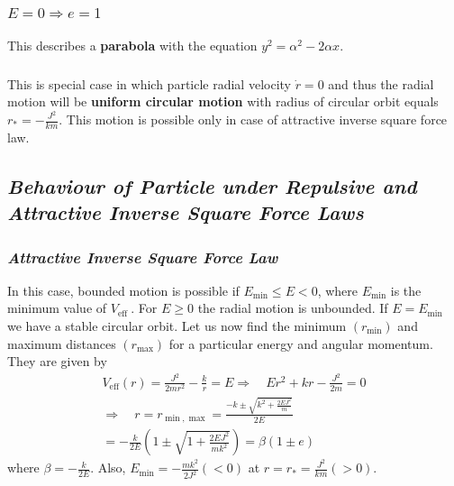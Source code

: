 \documentclass[conference]{IEEEtran}
\begin{document}
\subsubsection{\normalsize{\emph{\textbf{$E=0 \Rightarrow e=1$}}}} This describes a \textbf{parabola} with the equation $y^{2} = \alpha^{2} - 2\alpha x$.
\vspace{1em}



\subsubsection{} This is special case in which particle radial velocity $\dot{r} = 0$ and thus the radial motion will be \textbf{uniform circular motion} with radius of circular orbit equals $r_{*} = -\frac{J^2}{km}$. This motion is possible only in case of attractive inverse square force law.
\vspace{1em}




\subsection{\normalsize{\emph{\textbf{Behaviour of Particle under Repulsive and Attractive Inverse Square Force Laws}}}}

\subsubsection{\normalsize{\emph{\textbf{Attractive Inverse Square Force Law}}}}
In this case, bounded motion is possible if $E_{\min } \leq E<0$, where $E_{\min }$ is the minimum value of $V_{\text {eff }}$. For $E \geq 0$ the radial motion is unbounded. If $E=E_{\min }$ we have a stable circular orbit. Let us now find the minimum $(r_{\min})$ and maximum distances $(r_{\max})$ for a particular energy and
angular momentum. They are given by \begin{dmath}
\begin{array}{c}
V_{\mathrm{eff}}(r)=\frac{J^{2}}{2 m r^{2}}-\frac{k}{r}=E \Rightarrow \quad E r^{2}+k r-\frac{J^{2}}{2 m}=0 \\
\Rightarrow \quad r=r_{\min , \max }=\frac{-k \pm \sqrt{k^{2}+\frac{2 E J^{2}}{m}}}{2 E} \\
=-\frac{k}{2 E}\left(1 \pm \sqrt{1+\frac{2 E J^{2}}{m k^{2}}}\right) =\beta(1 \pm e)
\end{array}
\end{dmath} where $\beta=-\frac{k}{2 E}$. Also, $E_{\min }=-\frac{mk^{2}}{2 J^{2}}(<0)$ at $r = r_{*} = \frac{J^{2}}{km}(>0)$. 
\vspace{1em}
\end{document}

